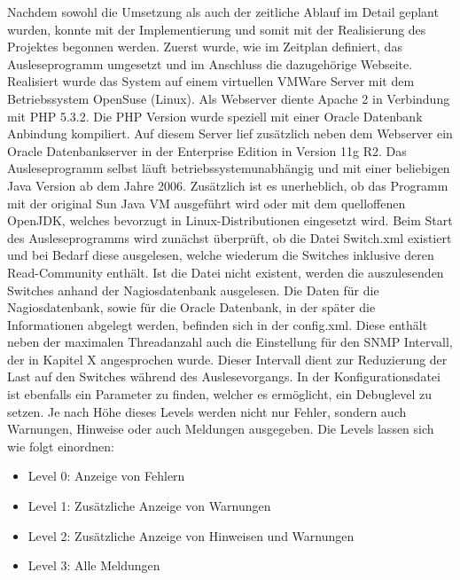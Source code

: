 Nachdem sowohl die Umsetzung als auch der zeitliche Ablauf im Detail geplant wurden, konnte mit der Implementierung und somit mit der Realisierung des Projektes begonnen werden.
Zuerst wurde, wie im Zeitplan definiert, das Ausleseprogramm umgesetzt und im Anschluss die dazugehörige Webseite.
Realisiert wurde das System auf einem virtuellen VMWare Server mit dem Betriebssystem OpenSuse (Linux). Als Webserver diente Apache 2 in Verbindung mit PHP 5.3.2. Die PHP Version wurde speziell mit einer Oracle Datenbank Anbindung kompiliert.
Auf diesem Server lief zusätzlich neben dem Webserver ein Oracle Datenbankserver in der Enterprise Edition in Version 11g R2.
Das Ausleseprogramm selbst läuft betriebssystemunabhängig und mit einer beliebigen Java Version ab dem Jahre 2006. Zusätzlich ist es unerheblich, ob das Programm mit der original Sun Java VM ausgeführt wird oder mit dem quelloffenen OpenJDK, welches bevorzugt in Linux-Distributionen eingesetzt wird.
Beim Start des Ausleseprogramms wird zunächst überprüft, ob die Datei Switch.xml existiert und bei Bedarf diese ausgelesen, welche wiederum die Switches inklusive deren Read-Community enthält. Ist die Datei nicht existent, werden die auszulesenden Switches anhand der Nagiosdatenbank ausgelesen. Die Daten für die Nagiosdatenbank, sowie für die Oracle Datenbank, in der später die Informationen abgelegt werden, befinden sich in der config.xml.
Diese enthält neben der maximalen Threadanzahl auch die Einstellung für den SNMP Intervall, der in Kapitel X angesprochen wurde.
Dieser Intervall dient zur Reduzierung der Last auf den Switches während des Auslesevorgangs.
In der Konfigurationsdatei ist ebenfalls ein Parameter zu finden, welcher es ermöglicht, ein Debuglevel zu setzen.
Je nach Höhe dieses Levels werden nicht nur Fehler, sondern auch Warnungen, Hinweise oder auch Meldungen ausgegeben.
Die Levels lassen sich wie folgt einordnen:\\
\begin{itemize}
\item Level 0: Anzeige von Fehlern
\item Level 1: Zusätzliche Anzeige von Warnungen
\item Level 2: Zusätzliche Anzeige von Hinweisen und Warnungen
\item Level 3: Alle Meldungen\\
\end{itemize}

